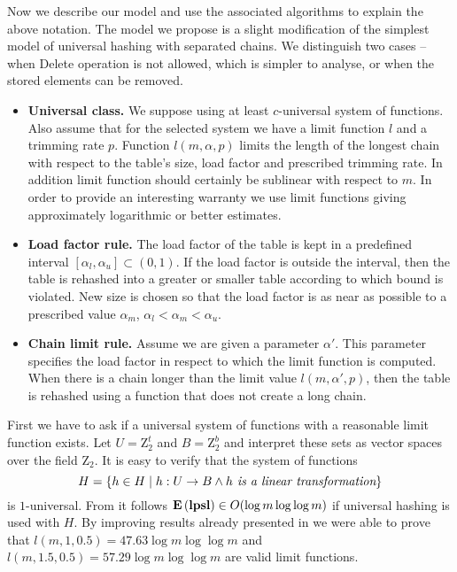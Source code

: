 Now we describe our model and use the associated algorithms to explain the above notation. The model we propose is a slight modification of the simplest model of universal hashing with separated chains. We distinguish two cases -- when Delete operation is not allowed, which is simpler to analyse, or when the stored elements can be removed.

\begin{itemize}
\item \textbf{Universal class.} We suppose using at least $c$-universal system of functions. Also assume that for the selected system we have a limit function $l$ and a trimming rate $p$. Function $l(m, \alpha, p)$ limits the length of the longest chain with respect to the table's size, load factor and prescribed trimming rate. In addition limit function should certainly be sublinear with respect to $m$. In order to provide an interesting warranty we use limit functions giving approximately logarithmic or better estimates.

\item \textbf{Load factor rule.} The load factor of the table is kept in a predefined interval $[\alpha_l, \alpha_u] \subset (0, 1)$. If the load factor is outside the interval, then the table is rehashed into a greater or smaller table according to which bound is violated. New size is chosen so that the load factor is as near as possible to a prescribed value $\alpha_m$, $\alpha_l < \alpha_m < \alpha_u$. 

\item \textbf{Chain limit rule.} Assume we are given a parameter $\alpha'$. This parameter specifies the load factor in respect to which the limit function is computed. When there is a chain longer than the limit value $l(m, \alpha', p)$, then the table is rehashed using a function that does not create a long chain. 
\end{itemize}



First we have to ask if a universal system of functions with a reasonable limit function exists. Let $U = \mathrm{Z}_2^t$ and $B = \mathrm{Z}_2^b$ and interpret these sets as vector spaces over the field $\mathrm{Z_2}$. It is easy to verify that the system of functions \[ H = \{h \in H \mid h: U \rightarrow B \wedge h \textit{ is a linear transformation}\} \] is $1$-universal. From \cite{DBLP:journals/jacm/AlonDMPT99} it follows $\mathbf{E}\left(\mathbf{lpsl}\right) \in O(\log m \log \log m)$ if universal hashing is used with $H$. By improving results already presented in \cite{DBLP:journals/jacm/AlonDMPT99} we were able to prove that $l(m, 1, 0.5) = 47.63 \log m \log \log m$ and $l(m, 1.5, 0.5) = 57.29 \log m \log \log m$ are valid limit functions.

